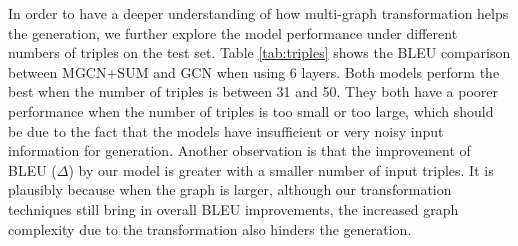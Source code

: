 \documentclass[11pt,a4paper]{article}
\begin{document}
\begin{table}[t!]
	\centering
\caption{Results of the ablation study.}
	\label{tab:ablation}
\end{table}


In order to have a deeper understanding of how multi-graph transformation helps the generation, we further explore the model performance under different numbers of triples on the test set.
Table \ref{tab:triples} shows the BLEU comparison between MGCN+SUM and GCN when using 6 layers.
Both models perform the best when the number of triples is between 31 and 50.
They both have a poorer performance when the number of triples is too small or too large, which should be due to the fact that the models have insufficient or very noisy input information for generation. 
Another observation is that the improvement of BLEU ($\Delta$) by our model is greater with a smaller number of input triples. It is plausibly because when the graph is larger, although our transformation techniques still bring in overall BLEU improvements, the increased graph complexity due to the transformation also hinders the generation.
\end{document}
